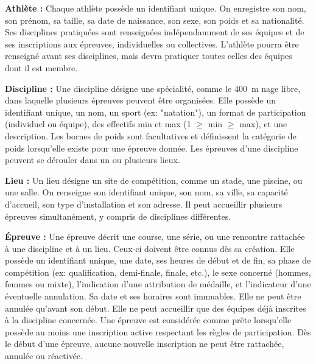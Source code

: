 \begin{concepts}
    \item \textbf{Athlète :} Chaque athlète possède un identifiant unique. On enregistre son nom, son prénom, sa taille, sa date de naissance, son sexe, son poids et sa nationalité. Ses disciplines pratiquées sont renseignées indépendamment de ses équipes et de ses inscriptions aux épreuves, individuelles ou collectives. L'athlète pourra être renseigné avant ses disciplines, mais devra pratiquer toutes celles des équipes dont il est membre.
    
    \item \textbf{Discipline :} Une discipline désigne une spécialité, comme le 400~m nage libre, dans laquelle plusieurs épreuves peuvent être organisées. Elle possède un identifiant unique, un nom, un sport (ex: "natation"), un format de participation (individuel ou équipe), des effectifs min et max (1 $\ge$ min $\ge$ max), et une description. Les bornes de poids sont facultatives et définissent la catégorie de poids lorsqu'elle existe pour une épreuve donnée. Les épreuves d'une discipline peuvent se dérouler dans un ou plusieurs lieux.
    
    \item \textbf{Lieu :} Un lieu désigne un site de compétition, comme un stade, une piscine, ou une salle. On renseigne son identifiant unique, son nom, sa ville, sa capacité d'accueil, son type d'installation et son adresse. Il peut accueillir plusieurs épreuves simultanément, y compris de disciplines différentes.
    
    \item \textbf{Épreuve :} Une épreuve décrit une course, une série, ou une rencontre rattachée à une discipline et à un lieu. Ceux-ci doivent être connus dès sa création. Elle possède un identifiant unique, une date, ses heures de début et de fin, sa phase de compétition (ex: qualification, demi-finale, finale, etc.), le sexe concerné (hommes, femmes ou mixte), l'indication d'une attribution de médaille, et l'indicateur d'une éventuelle annulation. Sa date et ses horaires sont immuables. Elle ne peut être annulée qu'avant son début. Elle ne peut accueillir que des équipes déjà inscrites à la discipline concernée. Une épreuve est considérée comme prête lorsqu'elle possède au moins une inscription active respectant les règles de participation. Dès le début d'une épreuve, aucune nouvelle inscription ne peut être rattachée, annulée ou réactivée.


\end{concepts}
